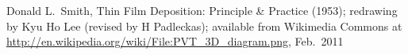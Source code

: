 Donald L.\ Smith, Thin Film Deposition: Principle & Practice (1953); redrawing by Kyu Ho Lee (revised by H Padleckas); available from Wikimedia Commons at \url{http://en.wikipedia.org/wiki/File:PVT_3D_diagram.png}, Feb.\ 2011%
